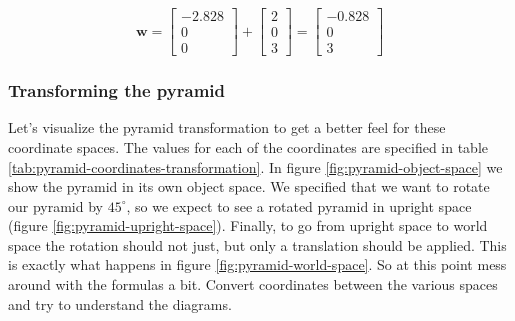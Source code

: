 \documentclass[a4paper,11pt]{article}
\begin{document}
$$\textbf{w}=\begin{bmatrix}-2.828 \\ 0 \\ 0\end{bmatrix}+\begin{bmatrix}2 \\ 0 \\ 3\end{bmatrix}=\begin{bmatrix}-0.828 \\ 0 \\ 3\end{bmatrix}$$

\subsubsection{Transforming the pyramid}

Let's visualize the pyramid transformation to get a better feel for these coordinate spaces. The values for each of the coordinates are specified in table \ref{tab:pyramid-coordinates-transformation}. In figure \ref{fig:pyramid-object-space} we show the pyramid in its own object space. We specified that we want to rotate our pyramid by $45^\circ$, so we expect to see a rotated pyramid in upright space (figure \ref{fig:pyramid-upright-space}). Finally, to go from upright space to world space the rotation should not just, but only a translation should be applied. This is exactly what happens in figure \ref{fig:pyramid-world-space}. So at this point mess around with the formulas a bit. Convert coordinates between the various spaces and try to understand the diagrams.
\end{document}
